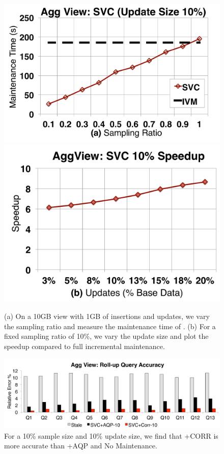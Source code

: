 \begin{figure}[t]
\centering
 \includegraphics[scale=0.14]{exp/msdc_1.pdf}
 \includegraphics[scale=0.14]{exp/msdc_2.pdf}\vspace{-.5em}
   \caption{(a) On a 10GB view with 1GB of insertions and updates, we vary the sampling ratio and measure the maintenance time of \svc. (b) For a fixed sampling ratio of 10\%, we vary the update size and plot the speedup compared to full incremental maintenance.\label{exp2-acc-sample}}
\end{figure}


\begin{figure}[t]
\centering
 \includegraphics[scale=0.14]{exp/msdc_3.pdf}\vspace{-.5em}
   \caption{For a 10\% sample size and 10\% update size, we find that \svcnospace+CORR is more accurate than \svcnospace+AQP and No Maintenance.\vspace{-.5em}\label{exp2-acc-sample2}}
\end{figure}



